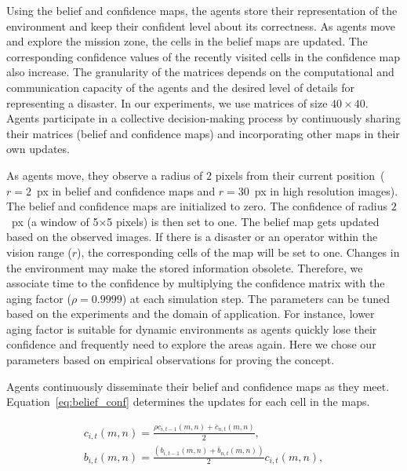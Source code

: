 \documentclass[runningheads]{llncs}%
\begin{document}
Using the belief and confidence maps, the agents store their representation of the environment and keep their confident level about its correctness. As agents move and explore the mission zone, the cells in the belief maps are updated. %
The corresponding confidence values of the recently visited cells in the confidence map {also increase. }
The granularity of the matrices depends on the computational and communication capacity of the agents and the desired level of details for representing a disaster. In our experiments, we use matrices of size $40\times40$. Agents participate in a collective decision-making process by continuously sharing their matrices (belief and confidence maps) and incorporating other maps in their own updates. 

As agents move, they observe a radius of $2$ pixels from their current position~($r=2$~px in belief and confidence maps and $r=30$~px in high resolution images). 
The belief and confidence maps are initialized to zero. The confidence of radius $2$~px (a window of 5$\times$5 pixels) is then set to one. The belief map gets updated based on the observed images. If there is a disaster or an operator within the vision range ($r$), the corresponding cells of the map will be set to one.  Changes in the environment may make the stored information obsolete. Therefore, we associate time to the confidence by multiplying the confidence matrix with the aging factor {($\rho =0.9999$)} at each simulation step. The parameters can be tuned based on the experiments and the domain of application. For instance, lower aging factor is suitable for dynamic environments as agents quickly lose their confidence and frequently need to explore the areas again. Here we chose our parameters based on empirical observations for proving the concept.

Agents continuously disseminate their belief and confidence maps as they meet. Equation~\ref{eq:belief_conf} determines the updates for each cell in the maps. 


\begin{equation}
\label{eq:belief_conf}
\begin{gathered}
    c_{i,t}(m,n) = \frac{\rho c_{i,t-1}(m,n) + \overline {c}_{n,t}(m,n)}{2},\\
    b_{i,t}(m,n) = \frac{(b_{i,t-1}(m,n) + \overline {b}_{n,t}(m,n))}{2} c_{i,t}(m,n),
\end{gathered}
\end{equation}
\end{document}
